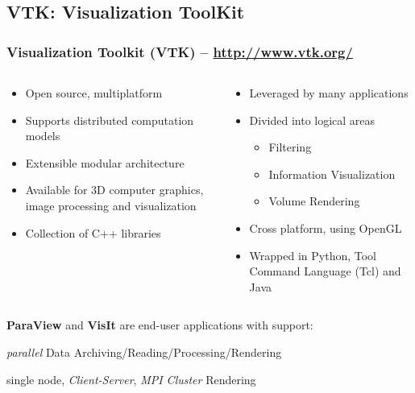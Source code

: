 \subsection{VTK: Visualization ToolKit}

\begin{frame}
\frametitle{Visualization Toolkit (VTK) -- \url{http://www.vtk.org/}}

\begin{columns}
\begin{column}{5.75cm}
\begin{itemize}
        \item Open source, multiplatform
        \item Supports distributed computation models
        \item Extensible modular architecture
        \item Available for 3D computer graphics, image processing and visualization
        \item Collection of C++ libraries
\end{itemize}
\end{column}
\begin{column}{5.75cm}
\begin{itemize}
        \item Leveraged by many applications
        \item Divided into logical areas
                \begin{itemize}
                        \item Filtering
                        \item Information Visualization
                        \item  Volume Rendering
                \end{itemize}
        \item Cross platform, using OpenGL
        \item Wrapped in Python, Tool Command Language (Tcl) and Java
\end{itemize}
\end{column}
\end{columns}

\vspace{3.5mm}
\textcolor{DarkBlue}{} {\bf ParaView} and {\bf VisIt} are end-user applications with support:

\hspace{5mm}
\textcolor{DarkBlue}{} \textit{parallel} Data Archiving/Reading/Processing/Rendering

\hspace{5mm}
\textcolor{DarkBlue}{} single node, \textit{Client-Server}, \textit{MPI Cluster} Rendering
\end{frame}

